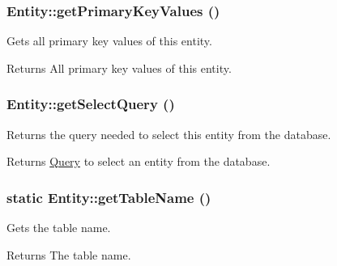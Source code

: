 \hypertarget{classEntity_a659a3f3946feb4fd3301fe3f8f6d4851}{
\subsubsection[{getPrimaryKeyValues}]{\setlength{\rightskip}{0pt plus 5cm}Entity::getPrimaryKeyValues ()}}
\label{classEntity_a659a3f3946feb4fd3301fe3f8f6d4851}
Gets all primary key values of this entity.

\begin{DoxyReturn}{Returns}
All primary key values of this entity. 
\end{DoxyReturn}
\hypertarget{classEntity_a6bca84b179145567662ee6441c27ac18}{
\subsubsection[{getSelectQuery}]{\setlength{\rightskip}{0pt plus 5cm}Entity::getSelectQuery ()}}
\label{classEntity_a6bca84b179145567662ee6441c27ac18}
Returns the query needed to select this entity from the database.

\begin{DoxyReturn}{Returns}
\hyperlink{classQuery}{Query} to select an entity from the database. 
\end{DoxyReturn}
\hypertarget{classEntity_a8305fd94740ac62cbafb9de76567ce37}{
\subsubsection[{getTableName}]{\setlength{\rightskip}{0pt plus 5cm}static Entity::getTableName ()}}
\label{classEntity_a8305fd94740ac62cbafb9de76567ce37}
Gets the table name.

\begin{DoxyReturn}{Returns}
The table name. 
\end{DoxyReturn}


